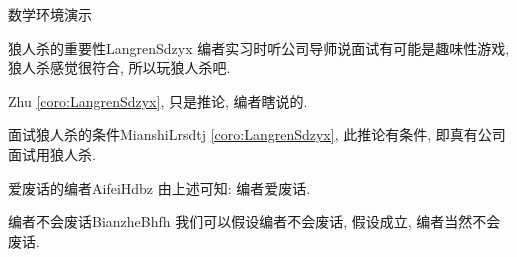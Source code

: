 \documentclass[hyperref,UTF8,11pt]{beamer}
\begin{document}
\begin{frame}{数学环境演示}
\begin{SCUcorollary}{狼人杀的重要性}{LangrenSdzyx}
		编者实习时听公司导师说面试有可能是趣味性游戏, 狼人杀感觉很符合, 所以玩狼人杀吧.
	\end{SCUcorollary}
	\begin{SCUremark}{}{Zhu}
		\vref{coro:LangrenSdzyx}, 只是推论, 编者瞎说的.
	\end{SCUremark}
	\begin{SCUcondition}{面试狼人杀的条件}{MianshiLrsdtj}
		\vref{coro:LangrenSdzyx}, 此推论有条件, 即真有公司面试用狼人杀.
	\end{SCUcondition}
	\begin{SCUconclusion}{爱废话的编者}{AifeiHdbz}
		由上述可知: 编者爱废话.
	\end{SCUconclusion}
	\begin{SCUassumption}{编者不会废话}{BianzheBhfh}
		我们可以假设编者不会废话, 假设成立, 编者当然不会废话.
	\end{SCUassumption}
\end{frame}
\end{document}
